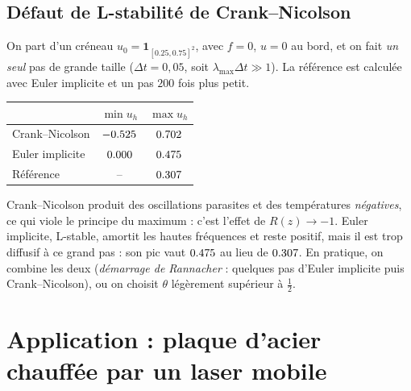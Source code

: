 \documentclass[11pt,a4paper]{article}
\begin{document}
\subsection{Défaut de L-stabilité de Crank--Nicolson}
On part d'un créneau $u_0 = \mathbf{1}_{[0.25,0.75]^2}$, avec $f=0$, $u=0$ au bord, et on fait
\emph{un seul} pas de grande taille ($\Delta t=0{,}05$, soit $\lambda_{\max}\Delta t \gg 1$).
La référence est calculée avec Euler implicite et un pas $200$ fois plus petit.
\begin{center}
\begin{tabular}{l c c}\toprule
 & $\min u_h$ & $\max u_h$ \\ \midrule
Crank--Nicolson & $\num{-0.525}$ & $\num{0.702}$ \\
Euler implicite & $\num{0.000}$ & $\num{0.475}$ \\
Référence & -- & $\num{0.307}$ \\ \bottomrule
\end{tabular}
\end{center}
Crank--Nicolson produit des oscillations parasites et des températures \emph{négatives}, ce qui viole
le principe du maximum : c'est l'effet de $R(z)\to-1$. Euler implicite, L-stable, amortit les
hautes fréquences et reste positif, mais il est trop diffusif à ce grand pas : son pic vaut $\num{0.475}$
au lieu de $\num{0.307}$. En pratique, on combine les deux (\emph{démarrage de Rannacher} : quelques pas
d'Euler implicite puis Crank--Nicolson), ou on choisit $\theta$ légèrement supérieur à $\frac12$.

\section{Application : plaque d'acier chauffée par un laser mobile}\label{sec:laser}
\end{document}
